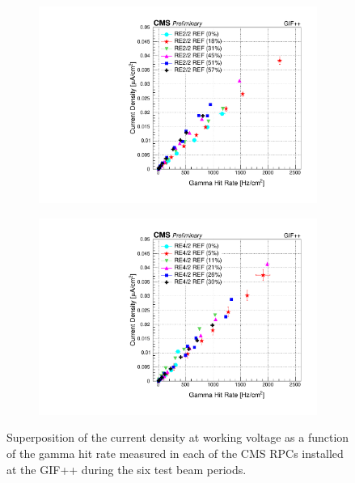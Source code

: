 \begin{figure}[H]
\begin{subfigure}{0.5\linewidth}
    		\includegraphics[width = \linewidth]{fig/chapt5/RE2-2_REF_Current_vs_Rate.pdf}
        	\caption{\label{fig:GIFpp_j_vs_rate:C}}
    	\end{subfigure}
    	\begin{subfigure}{0.5\linewidth}
			\centering
    		\includegraphics[width = \linewidth]{fig/chapt5/RE4-2_REF_Current_vs_Rate.pdf}
        	\caption{\label{fig:GIFpp_j_vs_rate:D}}
    	\end{subfigure}
		\caption{\label{fig:GIFpp_j_vs_rate} Superposition of the current density at working voltage as a function of the gamma hit rate measured in each of the CMS RPCs installed at the GIF++ during the six test beam periods.}
	\end{figure}
	
